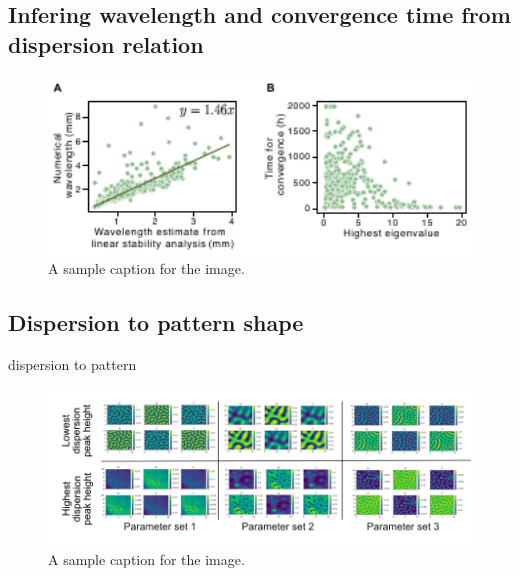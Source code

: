 \subsection{Infering wavelength and convergence time from dispersion relation}


\begin{figure}[H] %
    \centering
    \includegraphics[width=1\textwidth]{chapters/Chapter 1/dispersion_to_wavelength_convergence} %
    \caption{A sample caption for the image.}
    \label{fig:dispersion_to_wavelength_convergence} %
\end{figure}

\subsection{Dispersion to pattern shape}
dispersion to pattern
\begin{figure}[H] %
    \centering
    \includegraphics[width=1\textwidth]{chapters/Chapter 1/shape} %
    \caption{A sample caption for the image.}
    \label{fig:dispersion_to_shape} %
\end{figure}



